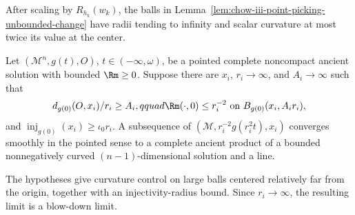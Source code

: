 \begin{remark}
\label{rem:chow-iii-unbounded-change-rescaled-balls}
After scaling by \(R_{h_k}(w_k)\), the balls in
Lemma~\ref{lem:chow-iii-point-picking-unbounded-change} have radii tending to
infinity and scalar curvature at most twice its value at the center.
\end{remark}

\begin{theorem}
\label{thm:chow-iii-dimension-reduction-one}
Let \((\mathcal M^n,g(t),O)\), \(t\in(-\infty,\omega)\), be a pointed complete
noncompact ancient solution with bounded \(\Rm\ge0\).  Suppose there are
\(x_i\), \(r_i\to\infty\), and \(A_i\to\infty\) such that
\[
 d_{g(0)}(O,x_i)/r_i\ge A_i,qquad
 \Rm(\cdot,0)\le r_i^{-2}\ \text{on }B_{g(0)}(x_i,A_ir_i),
\]
and \(\operatorname{inj}_{g(0)}(x_i)\ge\iota_0r_i\).  A subsequence of
\((\mathcal M,r_i^{-2}g(r_i^2t),x_i)\) converges smoothly in the pointed sense
to a complete ancient product of a bounded nonnegatively curved
\((n-1)\)-dimensional solution and a line.
\end{theorem}

\begin{remark}
\label{rem:chow-iii-dimension-reduction-one-interpretation}
The hypotheses give curvature control on large balls centered relatively far
from the origin, together with an injectivity-radius bound.  Since
\(r_i\to\infty\), the resulting limit is a blow-down limit.
\end{remark}

